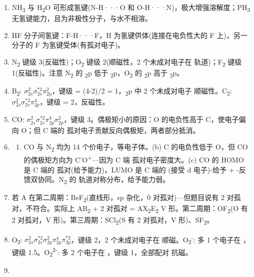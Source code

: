 \begin{enumerate}
\item
  NH\textsubscript{3} 与 H\textsubscript{2}O 可形成氢键(N-H···O 和 O-H···N)，极大增强溶解度；PH\textsubscript{3} 无氢键能力，且为非极性分子，与水不相溶。
\item
  HF 分子间氢键：F-H···F，H 为氢键供体(连接在电负性大的 F 上)，另一分子的 F 为氢键受体(有孤对电子)。
\item
  N\textsubscript{2} 键级 3(反磁性)；O\textsubscript{2} 键级 2(顺磁性，2 个未成对电子在 \派* 轨道)；F\textsubscript{2} 键级 1(反磁性)。注意 N\textsubscript{2} 的 \textsubscript{2}p 低于 \派\textsubscript{2}p，O\textsubscript{2} 的 \textsubscript{2}p 高于 \派\textsubscript{2}p。
\item
  B\textsubscript{2}: \(\sigma_{2s}^2 \sigma_{2s}^{*2} \pi_{2p}^2\)，键级 = (4-2)/2 = 1，\派\textsubscript{2}p 中 2 个未成对电子 \箭 顺磁性。C\textsubscript{2}: \(\sigma_{2s}^2 \sigma_{2s}^{*2} \pi_{2p}^4\)，键级 = 2，反磁性。
\item
  CO: \(\sigma_{2s}^2 \sigma_{2s}^{*2} \pi_{2p}^4 \sigma_{2p}^2\)，键级 3。偶极矩小的原因：O 的电负性高于 C，使电子偏向 O；但 C 端的  孤对电子贡献反向偶极矩，两者部分抵消。
\item
  \begin{enumerate}
  \def\labelenumii{(\alph{enumii})}
  \tightlist
  \item
    CO 与 N\textsubscript{2} 均为 14 个价电子，等电子体。(b) C 的电负性低于 O，但 CO 的偶极矩方向为 C\textsuperscript{-}O\textsuperscript{+}---因为 C 端  孤对电子密度大。(c) CO 的 HOMO 是 C 端的  孤对(给予能力)，LUMO 是 C 端的 \派*(接受 d 电子)\箭 -给予 + \派-反馈双协同。N\textsubscript{2} 的  轨道对称分布， 给予能力弱。
  \end{enumerate}
\item
  若 A 在第二周期：BeF\textsubscript{2}(直线形，sp 杂化，0 对孤对)---但题目说有 2 对孤对，不符合。实际上 AB\textsubscript{2} + 2 对孤对 = AX\textsubscript{2}E\textsubscript{2} \箭 V 形。第二周期：OF\textsubscript{2}(O 有 2 对孤对，V 形)。第三周期：SCl\textsubscript{2}(S 有 2 对孤对，V 形)、SF\textsubscript{2}。
\item
  O\textsubscript{2}: \(\sigma_{2s}^2 \sigma_{2s}^{*2} \sigma_{2p}^2 \pi_{2p}^4 \pi_{2p}^{*2}\)，键级 2，2 个未成对电子在 \派* \箭 顺磁。O\textsubscript{2}\textsuperscript{-}: 多 1 个电子在 \派*，键级 1.5。O\textsubscript{2}\textsuperscript{2-}: 多 2 个电子在 \派*，键级 1，全部配对 \箭 抗磁。
\item
  \begin{enumerate}

\end{enumerate}
\end{enumerate}
